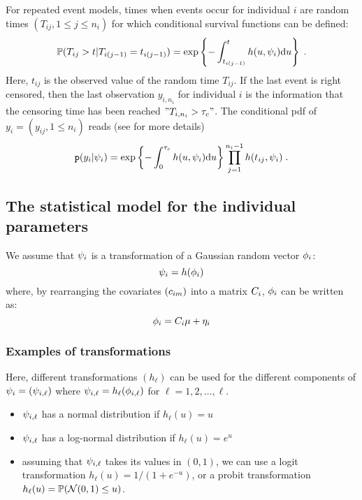 For repeated event models, times when events occur for individual $i$ are random times $(T_{ij}, 1\leq j \leq n_i)$  for which conditional survival functions can be defined:
\begin{equation}
\mathbb{P}(T_{ij} > t|T_{i(j-1)}=t_{i(j-1)}) = \exp\left\{-\int_{t_{i(j-1)}}^{t}h(u, \psi_i)\textrm{d}u\right\}\;.
\end{equation}
Here, $t_{ij}$ is the observed value of the random time $T_{ij}$.
If the last event is right censored, then the last observation $y_{i,n_i}$ for individual $i$ is the information that the censoring time has been reached $"T_{i,n_i} > \tau_c"$. The conditional pdf of $y_i = (y_{ij},1\leq n_i)$ reads (see \cite{LavielleMonolix} for more details)
\begin{equation} \label{pdf_tte}
\texttt{p}(y_i |\psi_i) = \exp\left\{-\int_{0}^{\tau_c}h(u, \psi_i)\textrm{d}u \right\} \prod_{j=1}^{n_i-1} h(t_{ij},\psi_i)\;.
\end{equation}

\subsection{The statistical model for the individual parameters} \label{section_model_indiv}

We assume that ${\psi_i}$ is a transformation of a Gaussian random vector ${{\phi}_i}$:
\begin{equation} \label{prior2}
{\psi_i}=h({{\phi}_i})
\end{equation}
where, by rearranging the covariates $(c_{im})$ into a matrix $C_i$, ${{\phi}_i}$ can be written as:
\begin{equation} \label{prior3}
\phigi=\Covariate_i \fixed_effect + \etagi
\end{equation}

\subsubsection{Examples of transformations}
Here, different transformations $(h_\ell)$ can be used for the different components of ${\psi_i}=({\psi_{i,\ell}})$ where ${\psi_{i,\ell}}=h_\ell({{\phi}_{i,\ell}})$ for $\ell=1, 2, \ldots , \ell$.
\begin{itemize}
\item ${\psi_{i,\ell}}$ has a normal distribution if $h_\ell(u)=u$
\item ${\psi_{i,\ell}}$ has a log-normal distribution if $h_\ell(u)=e^u$
\item assuming that ${\psi_{i,\ell}}$ takes its values in $(0,1)$, we can use a logit transformation $h_\ell(u)=1/(1+e^{-u})$, or a probit transformation $h_\ell(u)=\mathbb{P}\!\left({\cal N}(0,1)\leq u\right)$.
\end{itemize}


